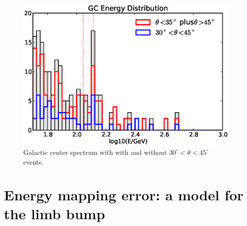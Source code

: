 \documentclass[aps,twocolumn,prd,superscriptaddress,showpacs,nofootinbib,fixfloat]{revtex4}
\begin{document}
\begin{figure}[p]
  \centering
  \includegraphics[width=1.0\linewidth]{plots/gc_energy.eps}
  \caption{Galactic center spectrum with with and without
  $30^\circ<\theta<45^\circ$ events.}
  \label{fig:GCevents}
\end{figure}



\clearpage

\section{Energy mapping error: a model for the limb bump}
\end{document}
